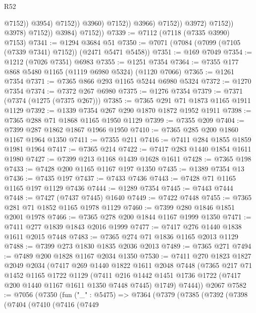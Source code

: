 \begin{lexlean}{R52}
\begin{coremodule}
                                            @7152))
                                        @3954)
                                      @7152))
                                  @3960)
                                @7152))
                            @3966)
                          @7152))
                      @3972)
                    @7152))
                @3978)
              @7152))
          @3984)
        @7152))
@7339 := @7112 (@7118 (@7335 @3990) @7153)
@7341 := @1294 @3684 @51
@7350 := @7071 (@7084 (@7099 (@7105 (@7339 @7341) @7152)) (@2471 @5471 @5458))
@7351 := @169 @7049
@7354 := @1212 (@7026 @7351) @6983
@7355 := @1251 @7354
@7364 := @7355 @177 @868 @5480 @1165 (@1119 @6980 @5324) (@1120 @7066)
@7365 := @1261 @7354
@7371 := @7365 @866 @293 @1165 @5244 @6980 @5324
@7372 := @1270 @7354
@7374 := @7372 @267 @6980
@7375 := @1276 @7354
@7379 := @7371 (@7374 (@1275 (@7375 @267)))
@7385 := @7365 @291 @71 @1873 @1165 @1911 @1129
@7392 := @1339 @7354 @267 @290 @1870 @1872 @1952 @1911
@7398 := @7365 @288 @71 @1868 @1165 @1950 @1129
@7399 := @7355 @209
@7404 := @7399 @287 @1862 @1867 @1966 @1950
@7410 := @7365 @285 @200 @1860 @1167 @1964 @1350
@7411 := @7355 @211
@7416 := @7411 @284 @1855 @1859 @1981 @1964
@7417 := @7365 @214
@7422 := @7417 @283 @1440 @1854 @1611 @1980
@7427 := @7399 @213 @1168 @1439 @1628 @1611
@7428 := @7365 @198
@7433 := @7428 @200 @1165 @1167 @197 @1350
@7435 := @1389 @7354 @13
@7436 := @7435 @197
@7437 := @7433 @7436
@7443 := @7428 @71 @1165 @1165 @197 @1129 @7436
@7444 := @1289 @7354
@7445 := @7443 @7444
@7448 := @7427 (@7437 @7445) @1640
@7449 := @7422 @7448
@7455 := @7365 @281 @71 @1852 @1165 @1978 @1129
@7460 := @7399 @280 @1846 @1851 @2001 @1978
@7466 := @7365 @278 @200 @1844 @1167 @1999 @1350
@7471 := @7411 @277 @1839 @1843 @2016 @1999
@7477 := @7417 @276 @1440 @1838 @1611 @2015 @7448
@7483 := @7365 @274 @71 @1836 @1165 @2013 @1129
@7488 := @7399 @273 @1830 @1835 @2036 @2013
@7489 := @7365 @271
@7494 := @7489 @200 @1828 @1167 @2034 @1350
@7530 := @7411
    @270
    @1823
    @1827
    @2049
    @2034
    (@7417
      @269
      @1440
      @1822
      @1611
      @2048
      @7448
      (@7365
        @217
        @71
        @1452
        @1165
        @1722
        @1129
        (@7411 @216 @1442 @1451 @1736 @1722 (@7417 @200 @1440 @1167 @1611 @1350 @7448 @7445) @1749)
        @7444))
    @2067
@7582 := @7056
    (@7350
      (fun ("_" : @5475) =>
      @7364
        (@7379
          (@7385
            (@7392
              (@7398
                (@7404
                  (@7410
                    (@7416
                      (@7449

\end{coremodule}
\end{lexlean}
